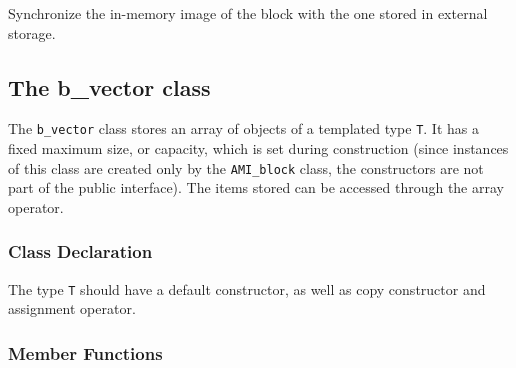          {Synchronize the in-memory image of the
        block with the one stored in external storage.}

   \etabb

\subsection{The  b\_vector class}

The \lstinline|b_vector| class stores an array of objects of a templated type
\lstinline|T|. It has a fixed maximum size, or capacity, which is set during
construction (since instances of this class are created only by the
\lstinline|AMI_block| class, the constructors are not part of the public
interface). The items stored can be accessed through the array operator.

\subsubsection{Class Declaration}
   \btabb 
         {The type \lstinline|T|
        should have a default constructor, as well as copy constructor and
        assignment operator.}
   \etabb

%
%

\subsubsection{Member Functions}

   \btabb



